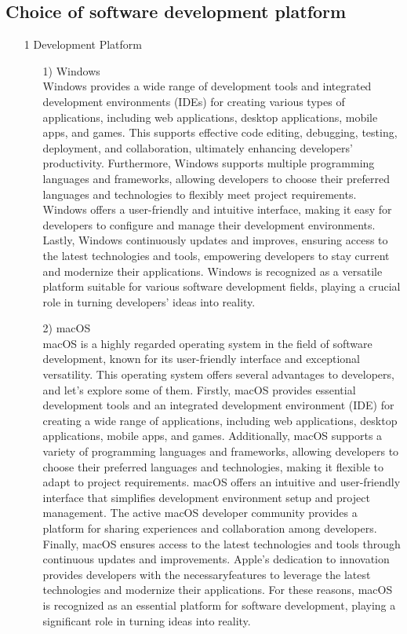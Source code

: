 \documentclass[conference]{IEEEtran}
\begin{document}
\subsection{Choice of software development platform}
\begin{enumerate}

\item[1] Development Platform

\begin{itemize}
\item [1)] Windows\\
Windows provides a wide range of development tools and integrated development environments (IDEs) for creating various types of applications, including web applications, desktop applications, mobile apps, and games. This supports effective code editing, debugging, testing, deployment, and collaboration, ultimately enhancing developers’ productivity. Furthermore, Windows supports multiple programming languages and frameworks, allowing developers to choose their preferred languages and technologies to flexibly meet project requirements. Windows offers a user-friendly and intuitive interface, making it easy for developers to configure and manage their development environments. Lastly, Windows continuously updates and improves, ensuring access to the latest technologies and tools, empowering developers to stay current and modernize their applications. Windows is recognized as a versatile platform suitable for various software development fields, playing a crucial role in turning developers’ ideas into reality. \\

\item [2)] macOS\\
macOS is a highly regarded operating system in the field of software development, known for its user-friendly interface and exceptional versatility. This operating system offers several advantages to developers, and let’s explore some of them. Firstly, macOS provides essential development tools and an integrated development environment (IDE) for creating a wide range of applications, including web applications, desktop applications, mobile apps, and games. Additionally, macOS supports a variety of programming languages and frameworks, allowing developers to choose their preferred languages and technologies, making it flexible to adapt to project requirements. macOS offers an intuitive and user-friendly interface that simplifies development environment setup and project management. The active macOS developer community provides a platform for sharing experiences and collaboration among developers. Finally, macOS ensures access to the latest technologies and tools through continuous updates and improvements. Apple’s dedication to innovation provides developers with the necessaryfeatures to leverage the latest technologies and modernize their applications. For these reasons, macOS is recognized as an essential platform for software development, playing a significant role in turning ideas into reality. \\
\end{itemize}
\end{enumerate}
\end{document}
